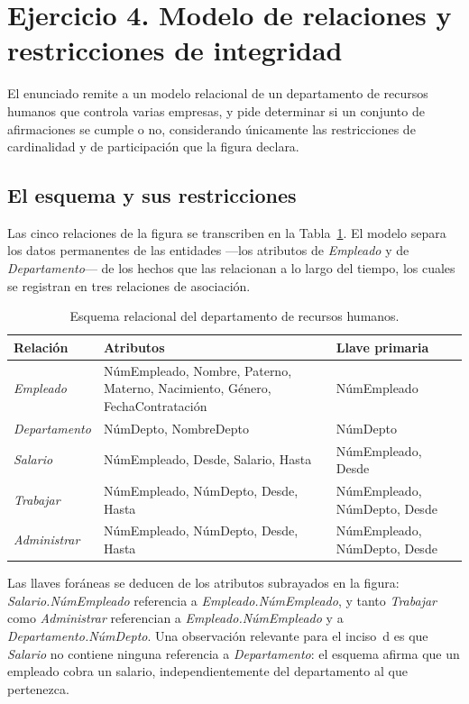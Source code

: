
\section{Ejercicio 4. Modelo de relaciones y restricciones de integridad}

El enunciado remite a un modelo relacional de un departamento de recursos
humanos que controla varias empresas, y pide determinar si un conjunto de
afirmaciones se cumple o no, considerando únicamente las restricciones de
cardinalidad y de participación que la figura declara.

\subsection{El esquema y sus restricciones}

Las cinco relaciones de la figura se transcriben en la
Tabla~\ref{tab:esquema}. El modelo separa los datos permanentes de las
entidades ---los atributos de \emph{Empleado} y de \emph{Departamento}--- de
los hechos que las relacionan a lo largo del tiempo, los cuales se registran
en tres relaciones de asociación.

\begin{table}[htbp]
  \centering \caption{Esquema relacional del departamento de recursos
    humanos.}
  \label{tab:esquema}
  \small
  \begin{tabularx}{\textwidth}{@{}l >{\raggedright\arraybackslash} X l@{}}
    \toprule
    \textbf{Relación} & \textbf{Atributos} & \textbf{Llave primaria} \\
    \midrule
    \emph{Empleado}
      & NúmEmpleado, Nombre, Paterno, Materno, Nacimiento, Género,
        FechaContratación
      & NúmEmpleado \\
    \emph{Departamento}
      & NúmDepto, NombreDepto
      & NúmDepto \\
    \emph{Salario}
      & NúmEmpleado, Desde, Salario, Hasta
      & NúmEmpleado, Desde \\
    \emph{Trabajar}
      & NúmEmpleado, NúmDepto, Desde, Hasta
      & NúmEmpleado, NúmDepto, Desde \\
    \emph{Administrar}
      & NúmEmpleado, NúmDepto, Desde, Hasta
      & NúmEmpleado, NúmDepto, Desde \\
    \bottomrule
  \end{tabularx}
\end{table}

Las llaves foráneas se deducen de los atributos subrayados en la figura:
\emph{Salario.NúmEmpleado} referencia a \emph{Empleado.NúmEmpleado}, y tanto
\emph{Trabajar} como \emph{Administrar} referencian a
\emph{Empleado.NúmEmpleado} y a \emph{Departamento.NúmDepto}. Una observación
relevante para el inciso~d es que \emph{Salario} no contiene ninguna
referencia a \emph{Departamento}: el esquema afirma que un empleado cobra un
salario, independientemente del departamento al que pertenezca.

